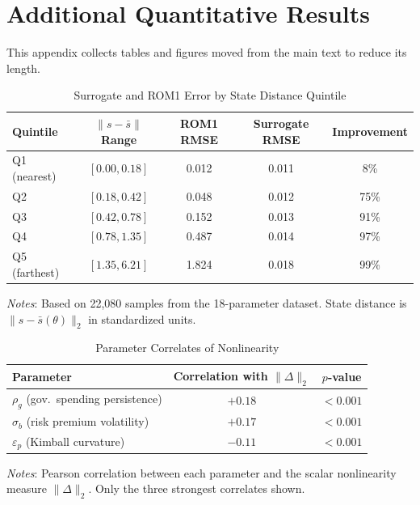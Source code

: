 \documentclass[12pt]{article}
\theoremstyle{plain}
\theoremstyle{definition}
\theoremstyle{remark}
\begin{document}
\section{Additional Quantitative Results}
\label{app:additional_results}

This appendix collects tables and figures moved from the main text to reduce its length.

\begin{table}[htbp]
\centering
\caption{Surrogate and ROM1 Error by State Distance Quintile}
\label{tab:error_by_distance}
\begin{tabular}{lcccc}
\toprule
Quintile & $\|s - \bar{s}\|$ Range & ROM1 RMSE & Surrogate RMSE & Improvement \\
\midrule
Q1 (nearest) & $[0.00, 0.18]$ & 0.012 & 0.011 & 8\% \\
Q2 & $[0.18, 0.42]$ & 0.048 & 0.012 & 75\% \\
Q3 & $[0.42, 0.78]$ & 0.152 & 0.013 & 91\% \\
Q4 & $[0.78, 1.35]$ & 0.487 & 0.014 & 97\% \\
Q5 (farthest) & $[1.35, 6.21]$ & 1.824 & 0.018 & 99\% \\
\bottomrule
\end{tabular}
\smallskip
{\footnotesize \textit{Notes}: Based on 22,080 samples from the 18-parameter dataset. State distance is $\|s - \bar{s}(\theta)\|_2$ in standardized units.}
\end{table}

\begin{table}[htbp]
\centering
\caption{Parameter Correlates of Nonlinearity}
\label{tab:param_nonlinearity}
\begin{tabular}{lcc}
\toprule
Parameter & Correlation with $\|\Delta\|_2$ & $p$-value \\
\midrule
$\rho_g$ (gov.\ spending persistence) & $+0.18$ & $< 0.001$ \\
$\sigma_b$ (risk premium volatility) & $+0.17$ & $< 0.001$ \\
$\varepsilon_p$ (Kimball curvature) & $-0.11$ & $< 0.001$ \\
\bottomrule
\end{tabular}
\smallskip
{\footnotesize \textit{Notes}: Pearson correlation between each parameter and the scalar nonlinearity measure $\|\Delta\|_2$. Only the three strongest correlates shown.}
\end{table}
\end{document}
